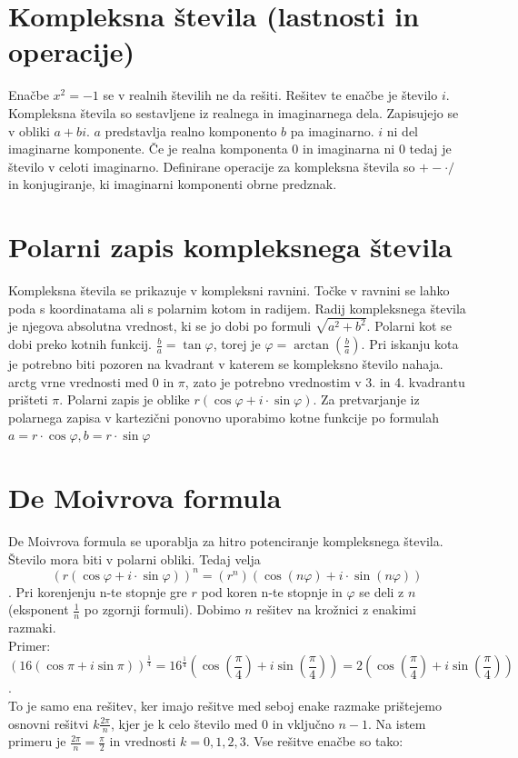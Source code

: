 \documentclass[12pt]{report}
\begin{document}
\section*{Kompleksna števila (lastnosti in operacije)}
Enačbe $x^{2}=-1$ se v realnih številih ne da rešiti. Rešitev te enačbe je število $i$. Kompleksna števila so sestavljene iz realnega in imaginarnega dela. Zapisujejo se v obliki $a+bi$. $a$ predstavlja realno komponento $b$ pa imaginarno. $i$ ni del imaginarne komponente. Če je realna komponenta $0$ in imaginarna ni $0$ tedaj je število v celoti imaginarno. Definirane operacije za kompleksna števila so $+ - \cdot /$ in konjugiranje, ki imaginarni komponenti obrne predznak.

\section*{Polarni zapis kompleksnega števila}
Kompleksna števila se prikazuje v kompleksni ravnini. Točke v ravnini se lahko poda s koordinatama ali s polarnim kotom in radijem. Radij kompleksnega števila je njegova absolutna vrednost, ki se jo dobi po formuli $\sqrt{a^{2}+b^{2}}$. Polarni kot se dobi preko kotnih funkcij. $\frac{b}{a} = \tan\varphi$, torej je $\varphi=\arctan(\frac{b}{a})$. Pri iskanju kota je potrebno biti pozoren na kvadrant v katerem se kompleksno število nahaja. arctg vrne vrednosti med $0$ in $\pi$, zato je potrebno vrednostim v 3. in 4. kvadrantu prišteti $\pi$. Polarni zapis je oblike $r(\cos\varphi + i\cdot \sin\varphi)$. Za pretvarjanje iz polarnega zapisa v kartezični ponovno uporabimo kotne funkcije po formulah $a=r\cdot \cos\varphi, b=r \cdot \sin\varphi$

\section*{De Moivrova formula}
De Moivrova formula se uporablja za hitro potenciranje kompleksnega števila. Število mora biti v polarni obliki. Tedaj velja 
\[(r(\cos\varphi + i \cdot \sin\varphi))^{n}=(r^{n})(\cos(n\varphi) + i \cdot \sin(n\varphi))\]. 
\bigbreak
Pri korenjenju n-te stopnje gre $r$ pod koren n-te stopnje in $\varphi$ se deli z $n$ (eksponent $\frac{1}{n}$ po zgornji formuli). Dobimo $n$ rešitev na krožnici z enakimi razmaki.\\
\bigbreak
Primer: \[(16(\cos\pi + i \sin\pi))^{\frac{1}{4}} = 16^{\frac{1}{4}}(\cos(\frac{\pi}{4}) + i\sin(\frac{\pi}{4})) =  2(\cos(\frac{\pi}{4})+i\sin(\frac{\pi}{4}))\].\\ 
\bigbreak
To je samo ena rešitev, ker imajo rešitve med seboj enake razmake prištejemo osnovni rešitvi $k\frac{2\pi}{n}$, kjer je k celo število med 0 in vključno $n-1$. Na istem primeru je $\frac{2\pi}{n}=\frac{\pi}{2}$ in vrednosti $k = {0, 1, 2, 3}$. Vse rešitve enačbe so tako:
\end{document}
